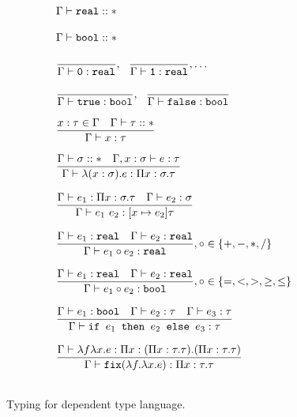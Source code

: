 \begin{figure}
\[
\begin{array}{lr}
\Gamma \vdash \texttt{real} :: * \\ \\
\Gamma \vdash \texttt{bool} :: * \\ \\
\dfrac{}{\Gamma \vdash \texttt{0}: \texttt{real}}, \ \ \dfrac{}{\Gamma \vdash \texttt{1}: \texttt{real}}, \ldots \\ \\
\dfrac{}{\Gamma \vdash \texttt{true} : \texttt{bool}}, \ \ \dfrac{}{\Gamma \vdash \texttt{false} : \texttt{bool}} \\  \\
\dfrac{x : \tau \in \Gamma \ \ \ \Gamma \vdash \tau :: *}{\Gamma \vdash x : \tau } \\ \\ 
\dfrac{\Gamma \vdash \sigma :: * \ \ \ \Gamma, x : \sigma \vdash e : \tau}
	{\Gamma \vdash \lambda (x : \sigma).e : \Pi x:\sigma.\tau } \\ \\
\dfrac{\Gamma \vdash e_1: \Pi x:\sigma.\tau \ \ \ \Gamma \vdash e_2 : \sigma}
	{\Gamma \vdash e_1 \ e_2 : [x \mapsto e_2]\tau} \\ \\
\dfrac{\Gamma \vdash e_1 : \texttt{real} \ \ \ \Gamma \vdash e_2 : \texttt{real}}
	{\Gamma \vdash e_1 \circ e_2 : \texttt{real}}
, \circ \in \{+,-,*,/\} \\ \\ 
\dfrac{\Gamma \vdash e_1 : \texttt{real} \ \ \ \Gamma \vdash e_2 : \texttt{real}}
	{\Gamma \vdash e_1 \circ e_2 : \texttt{bool}}
	, \circ \in \{=, <, >, \geq, \leq\} \\ \\ 
\dfrac{\Gamma \vdash e_1 : \texttt{bool} \ \ \ \Gamma \vdash e_2 : \tau \ \ \ \Gamma \vdash e_3 : \tau}
	{\Gamma \vdash \ifelse{e_1}{e_2}{e_3} : \tau} \\ \\ 
\dfrac{\Gamma \vdash \lambda f \lambda x.e : \Pi x:(\Pi x:\tau.\tau).(\Pi x:\tau.\tau)}
	{\Gamma \vdash \texttt{fix}(\lambda f. \lambda x.e) : \Pi x:\tau.\tau} \\ \\ 
\end{array}
\]
\caption{Typing for dependent type language.}
\end{figure}


